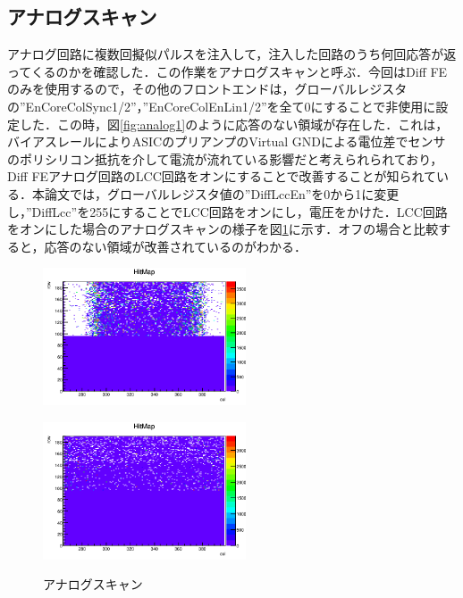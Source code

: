 \subsection{アナログスキャン}
アナログ回路に複数回擬似パルスを注入して，注入した回路のうち何回応答が返ってくるのかを確認した．この作業をアナログスキャンと呼ぶ．今回はDiff FEのみを使用するので，その他のフロントエンドは，グローバルレジスタの''EnCoreColSync1/2''，''EnCoreColEnLin1/2''を全て0にすることで非使用に設定した．この時，図\ref{fig:analog1}のように応答のない領域が存在した．これは，バイアスレールによりASICのプリアンプのVirtual GNDによる電位差でセンサのポリシリコン抵抗を介して電流が流れている影響だと考えられられており，Diff FEアナログ回路のLCC回路をオンにすることで改善することが知られている．本論文では，グローバルレジスタ値の''DiffLccEn''を0から1に変更し，''DiffLcc''を255にすることでLCC回路をオンにし，電圧をかけた．LCC回路をオンにした場合のアナログスキャンの様子を図\ref{fig:analog2}に示す．オフの場合と比較すると，応答のない領域が改善されているのがわかる．

\begin{figure}[h]
  \centering
  \begin{minipage}[b]{0.4\linewidth}
    \centering
    \includegraphics[width=6cm]{./figure/AnalogScan1.png}
    \label{fig:analog1}
  \end{minipage}
  \begin{minipage}[b]{0.4\linewidth}
    \includegraphics[width=6cm]{./figure/AnalogScan3.png}
    \label{fig:analog2}
  \end{minipage}
  \caption{アナログスキャン}
\end{figure}


